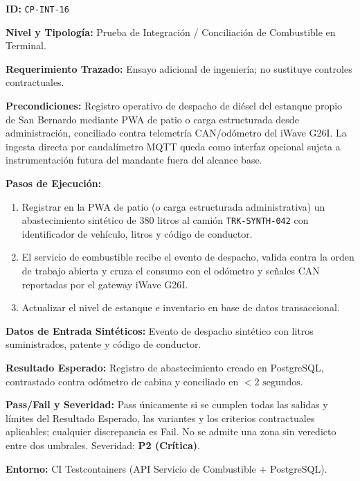 \par\noindent\textbf{ID:} \texttt{C\allowbreak{}P\allowbreak{}-\allowbreak{}I\allowbreak{}N\allowbreak{}T\allowbreak{}-\allowbreak{}1\allowbreak{}6\allowbreak{}}\par
\par\noindent\textbf{Nivel y Tipología:} Prueba de Integración / Conciliación de Combustible en Terminal.\par
\par\noindent\textbf{Requerimiento Trazado:} Ensayo adicional de ingeniería; no sustituye controles contractuales.\par
\par\noindent\textbf{Precondiciones:} Registro operativo de despacho de diésel del estanque propio de San Bernardo mediante PWA de patio o carga estructurada desde administración, conciliado contra telemetría CAN/odómetro del iWave G26I. La ingesta directa por caudalímetro MQTT queda como interfaz opcional sujeta a instrumentación futura del mandante fuera del alcance base.\par
\par\noindent\textbf{Pasos de Ejecución:} \par
\begin{enumerate}
\item Registrar en la PWA de patio (o carga estructurada administrativa) un abastecimiento sintético de 380 litros al camión \texttt{T\allowbreak{}R\allowbreak{}K\allowbreak{}-\allowbreak{}S\allowbreak{}Y\allowbreak{}N\allowbreak{}T\allowbreak{}H\allowbreak{}-\allowbreak{}0\allowbreak{}4\allowbreak{}2\allowbreak{}} con identificador de vehículo, litros y código de conductor.
\item El servicio de combustible recibe el evento de despacho, valida contra la orden de trabajo abierta y cruza el consumo con el odómetro y señales CAN reportadas por el gateway iWave G26I.
\item Actualizar el nivel de estanque e inventario en base de datos transaccional.
\end{enumerate}
\par\noindent\textbf{Datos de Entrada Sintéticos:} Evento de despacho sintético con litros suministrados, patente y código de conductor.\par
\par\noindent\textbf{Resultado Esperado:} Registro de abastecimiento creado en PostgreSQL, contrastado contra odómetro de cabina y conciliado en \(< 2\text{ segundos}\).\par
\par\noindent\textbf{Pass/Fail y Severidad:} Pass únicamente si se cumplen todas las salidas y límites del Resultado Esperado, las variantes y los criterios contractuales aplicables; cualquier discrepancia es Fail. No se admite una zona sin veredicto entre dos umbrales. Severidad: \textbf{P2 (Crítica)}.\par
\par\noindent\textbf{Entorno:} CI Testcontainers (API Servicio de Combustible + PostgreSQL).\par






